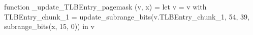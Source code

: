 function _update_TLBEntry_pagemask (v, x) = let v = { v with TLBEntry_chunk_1 = update_subrange_bits(v.TLBEntry_chunk_1, 54, 39, subrange_bits(x, 15, 0)) } in
  v

